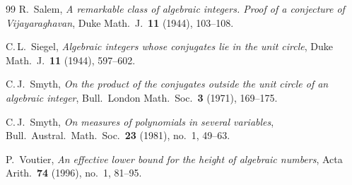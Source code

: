 \documentclass[12pt,a4paper]{amsart}
\theoremstyle{definition}
\theoremstyle{remark}
\begin{document}
\begin{thebibliography}{99}
R.\ Salem,
\textit{A remarkable class of algebraic integers. Proof of a conjecture of Vijayaraghavan},
Duke Math.\ J.\ \textbf{11} (1944), 103--108.

C.\,L.\ Siegel,
\textit{Algebraic integers whose conjugates lie in the unit circle},
Duke Math.\ J.\ \textbf{11} (1944), 597--602.

C.\,J.\ Smyth,
\textit{On the product of the conjugates outside the unit circle of an algebraic integer},
Bull.\ London Math.\ Soc.\ \textbf{3} (1971), 169--175.

C.\,J.\ Smyth,
\textit{On measures of polynomials in several variables},
Bull.\ Austral.\ Math.\ Soc.\ \textbf{23} (1981), no.\ 1, 49--63.

P.\ Voutier,
\textit{An effective lower bound for the height of algebraic numbers},
Acta Arith.\ \textbf{74} (1996), no.\ 1, 81--95.

\end{thebibliography}
\end{document}
